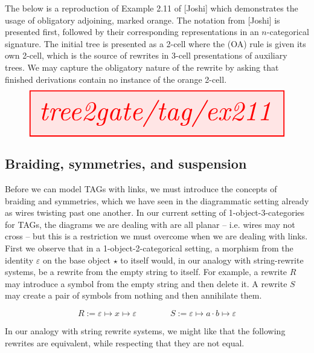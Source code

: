 \begin{fullwidth}
\begin{example}
The below is a reproduction of Example 2.11 of [Joshi] which demonstrates the usage of obligatory adjoining, marked orange. The notation from [Joshi] is presented first, followed by their corresponding representations in an $n$-categorical signature. The initial tree is presented as a 2-cell where the (OA) rule is given its own 2-cell, which is the source of rewrites in 3-cell presentations of auxiliary trees. We may capture the obligatory nature of the rewrite by asking that finished derivations contain no instance of the orange 2-cell.
\[\resizebox{\textwidth}{!}{\tikzfig{tree2gate/tag/ex211}}\]
\end{example}

\subsection{Braiding, symmetries, and suspension}

Before we can model TAGs with links, we must introduce the concepts of braiding and symmetries, which we have seen in the diagrammatic setting already as wires twisting past one another. In our current setting of 1-object-3-categories for TAGs, the diagrams we are dealing with are all planar -- i.e. wires may not cross -- but this is a restriction we must overcome when we are dealing with links.\\

First we observe that in a 1-object-2-categorical setting, a morphism from the identity $\varepsilon$ on the base object $\star$ to itself would, in our analogy with string-rewrite systems, be a rewrite from the empty string to itself. For example, a rewrite $R$ may introduce a symbol from the empty string and then delete it. A rewrite $S$ may create a pair of symbols from nothing and then annihilate them.

\[R := \varepsilon \mapsto x \mapsto \varepsilon \quad\quad\quad\quad S := \varepsilon \mapsto a \cdot b \mapsto \varepsilon\]

In our analogy with string rewrite systems, we might like that the following rewrites are equivalent, while respecting that they are not equal.


\end{fullwidth}
